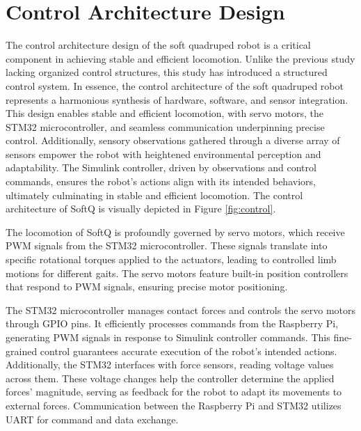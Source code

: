 \section{Control Architecture Design}
The control architecture design of the soft quadruped robot is a critical component in achieving stable and efficient locomotion. Unlike the previous study lacking organized control structures, this study has introduced a structured control system. In essence, the control architecture of the soft quadruped robot represents a harmonious synthesis of hardware, software, and sensor integration. This design enables stable and efficient locomotion, with servo motors, the STM32 microcontroller, and seamless communication underpinning precise control. Additionally, sensory observations gathered through a diverse array of sensors empower the robot with heightened environmental perception and adaptability. The Simulink controller, driven by observations and control commands, ensures the robot's actions align with its intended behaviors, ultimately culminating in stable and efficient locomotion. The control architecture of SoftQ is visually depicted in Figure \ref{fig:control}.


The locomotion of SoftQ is profoundly governed by servo motors, which receive \ac{PWM} signals from the STM32 microcontroller. These signals translate into specific rotational torques applied to the actuators, leading to controlled limb motions for different gaits. The servo motors feature built-in position controllers that respond to PWM signals, ensuring precise motor positioning.

The STM32 microcontroller manages contact forces and controls the servo motors through \ac{GPIO} pins. It efficiently processes commands from the Raspberry Pi, generating PWM signals in response to Simulink controller commands. This fine-grained control guarantees accurate execution of the robot's intended actions. Additionally, the STM32 interfaces with force sensors, reading voltage values across them. These voltage changes help the controller determine the applied forces' magnitude, serving as feedback for the robot to adapt its movements to external forces. Communication between the Raspberry Pi and STM32 utilizes \ac{UART} for command and data exchange.

